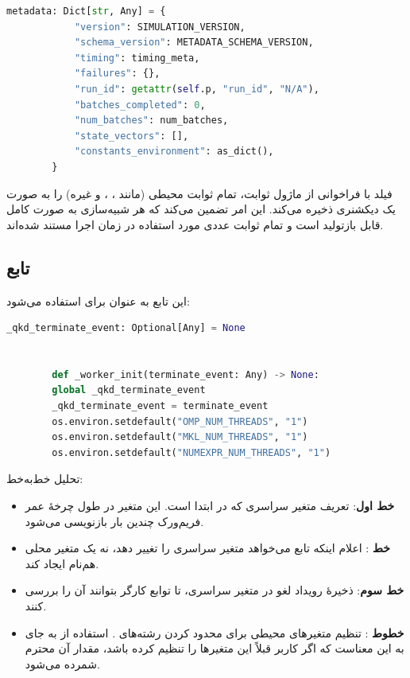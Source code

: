 \begin{LTR}
	\begin{lstlisting}[language=Python]
		metadata: Dict[str, Any] = {
			"version": SIMULATION_VERSION,
			"schema_version": METADATA_SCHEMA_VERSION,
			"timing": timing_meta,
			"failures": {},
			"run_id": getattr(self.p, "run_id", "N/A"),
			"batches_completed": 0,
			"num_batches": num_batches,
			"state_vectors": [],
			"constants_environment": as_dict(),
		}
	\end{lstlisting}
\end{LTR}

\noindent فیلد  با فراخوانی  از ماژول ثوابت، تمام ثوابت محیطی (مانند ، ،  و غیره) را به صورت یک دیکشنری ذخیره می‌کند. این امر تضمین می‌کند که هر شبیه‌سازی به صورت کامل قابل بازتولید است و تمام ثوابت عددی مورد استفاده در زمان اجرا مستند شده‌اند.

\subsection{تابع }

این تابع به عنوان  برای  استفاده می‌شود:

\begin{LTR}
	\begin{lstlisting}[language=Python]
		_qkd_terminate_event: Optional[Any] = None
		
		
		def _worker_init(terminate_event: Any) -> None:
		global _qkd_terminate_event
		_qkd_terminate_event = terminate_event
		os.environ.setdefault("OMP_NUM_THREADS", "1")
		os.environ.setdefault("MKL_NUM_THREADS", "1")
		os.environ.setdefault("NUMEXPR_NUM_THREADS", "1")
	\end{lstlisting}
\end{LTR}

\noindent تحلیل خط‌به‌خط:

\begin{itemize}
	\item \textbf{خط اول}: تعریف متغیر سراسری  که در ابتدا  است. این متغیر در طول چرخۀ عمر فریم‌ورک چندین بار بازنویسی می‌شود.
	\item \textbf{خط }: اعلام اینکه تابع می‌خواهد متغیر سراسری را تغییر دهد، نه یک متغیر محلی هم‌نام ایجاد کند.
	\item \textbf{خط سوم}: ذخیرۀ رویداد لغو در متغیر سراسری، تا توابع کارگر بتوانند آن را بررسی کنند.
	\item \textbf{خطوط }: تنظیم متغیرهای محیطی برای محدود کردن رشته‌های . استفاده از  به جای  به این معناست که اگر کاربر قبلاً این متغیرها را تنظیم کرده باشد، مقدار آن محترم شمرده می‌شود.
\end{itemize}

